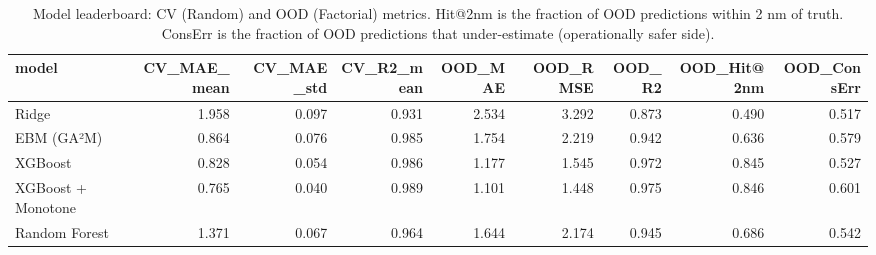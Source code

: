 \begin{table}
\caption{Model leaderboard: CV (Random) and OOD (Factorial) metrics. Hit@2nm is the fraction of OOD predictions within 2 nm of truth. ConsErr is the fraction of OOD predictions that under-estimate (operationally safer side).}
\label{tab:leaderboard}
\begin{tabular}{lrrrrrrrr}
\toprule
model & CV_MAE_mean & CV_MAE_std & CV_R2_mean & OOD_MAE & OOD_RMSE & OOD_R2 & OOD_Hit@2nm & OOD_ConsErr \\
\midrule
Ridge & 1.958 & 0.097 & 0.931 & 2.534 & 3.292 & 0.873 & 0.490 & 0.517 \\
EBM (GA²M) & 0.864 & 0.076 & 0.985 & 1.754 & 2.219 & 0.942 & 0.636 & 0.579 \\
XGBoost & 0.828 & 0.054 & 0.986 & 1.177 & 1.545 & 0.972 & 0.845 & 0.527 \\
XGBoost + Monotone & 0.765 & 0.040 & 0.989 & 1.101 & 1.448 & 0.975 & 0.846 & 0.601 \\
Random Forest & 1.371 & 0.067 & 0.964 & 1.644 & 2.174 & 0.945 & 0.686 & 0.542 \\
\bottomrule
\end{tabular}
\end{table}
